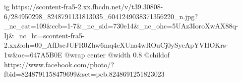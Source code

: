  
 
 
 
 

\ifcmt
  ig https://scontent-fra5-2.xx.fbcdn.net/v/t39.30808-6/284950298_8248791131813035_6041249038371356220_n.jpg?_nc_cat=109&ccb=1-7&_nc_sid=730e14&_nc_ohc=5UAz3IoroXwAX88q-Ij&_nc_ht=scontent-fra5-2.xx&oh=00_AfDseJUFR0Zhw6mq4eXUna4wROuCj0ySyeApYVHOKrs-1w&oe=647A5B0E
  @wrap center
  @width 0.8
  @childof https://www.facebook.com/photo/?fbid=8248791158479699&set=pcb.8248691251823023
\fi
